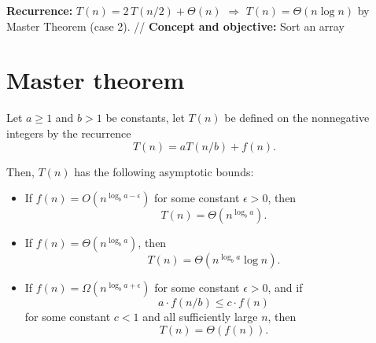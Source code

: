 \documentclass[11pt,a4paper,openany]{book}
\begin{document}
\textbf{Recurrence:} $T(n) = 2\,T(n/2) + \Theta(n)$ $\Rightarrow$ $T(n) = \Theta(n \log n)$ by Master Theorem (case 2).
//
\textbf{Concept and objective:} Sort an array















\vspace{2cm}







\section{Master theorem}

\begin{defnbox}[title=Theorem (Master Theorem)]
Let $a \geq 1$ and $b > 1$ be constants, let $T(n)$ be defined on the nonnegative integers by the recurrence
\[
T(n)=aT(n/b)+f(n).
\]

Then, $T(n)$ has the following asymptotic bounds:

\begin{itemize}
    \item If $f(n)=O\!\left(n^{\log_b a-\epsilon}\right)$ for some constant $\epsilon>0$, then
    \[
    T(n)=\Theta\!\left(n^{\log_b a}\right).
    \]

    \item If $f(n)=\Theta\!\left(n^{\log_b a}\right)$, then
    \[
    T(n)=\Theta\!\left(n^{\log_b a}\log n\right).
    \]

    \item If $f(n)=\Omega\!\left(n^{\log_b a+\epsilon}\right)$ for some constant $\epsilon>0$, and if
    \[
    a\cdot f(n/b)\leq c\cdot f(n)
    \]
    for some constant $c<1$ and all sufficiently large $n$, then
    \[
    T(n)=\Theta\!\left(f(n)\right).
    \]
\end{itemize}
\end{defnbox}







\vspace{2cm}





\end{document}
